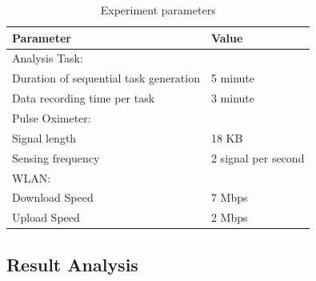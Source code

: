 \documentclass[final,5p,times,twocolumn]{elsarticle}
\begin{document}
\begin{table}[!h]
\centering
\scriptsize
\caption{Experiment parameters}\label{Tab.sim}
\begin{tabular}{|p{4.5cm}|p{2cm}|}
\hline
    Parameter & Value \\ \hline
    Analysis Task: & \\
    Duration of sequential task generation & 5 minute \\ 
    Data recording time per task & 3 minute \\ \hline  
    Pulse Oximeter: & \\
    Signal length & 18 KB \\
    Sensing frequency & 2 signal per second \\ \hline 
    WLAN: & \\
    Download Speed & 7 Mbps \\
    Upload Speed & 2 Mbps \\ \hline 
\end{tabular}
\end{table}
%
\subsection{Result Analysis}
\end{document}
